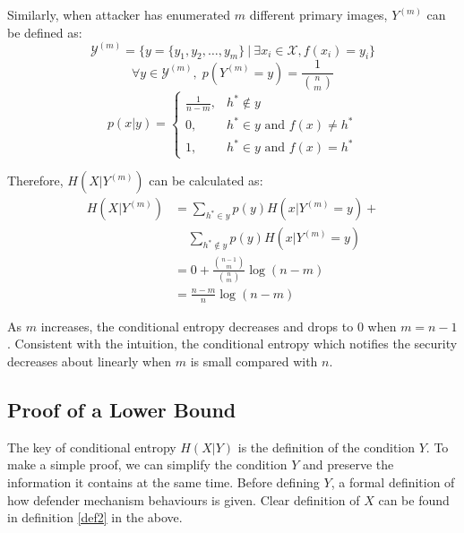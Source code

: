 \documentclass[10pt, conference, compsocconf]{IEEEtran}
\begin{document}
		Similarly, when attacker has enumerated $m$ different primary images, $Y^{(m)}$ can be defined
		as:
		\begin{equation*}
			\mathcal Y^{(m)} = \{ y = \{y_1, y_2, \ldots, y_m\} \: | \: \exists x_i \in \mathcal X, f(x_i) = y_i\}
		\end{equation*}
		\begin{equation*}
			\forall y \in \mathcal Y^{(m)}, \; p(Y^{(m)} = y) = \frac{1}{\binom{n}{m}}
		\end{equation*}
		\begin{equation*}
			p(x|y) = \begin{cases}
				\frac{1}{n-m}, &h^* \notin y\\
				0, &h^* \in y \text{ and } f(x) \neq h^*\\
				1, &h^* \in y \text{ and } f(x) = h^*
			\end{cases}
		\end{equation*}
		
		Therefore, $H(X | Y^{(m)})$ can be calculated as:
		\begin{align*}
			H(X | Y^{(m)}) %
				&= \sum_{h^* \in y} p(y) H(x | Y^{(m)} = y) + \\
					& \;\;\;\; \sum_{h^* \notin y} p(y) H(x | Y^{(m)} = y)\\
				&= 0+\frac{\binom{n-1}{m}}{\binom{n}{m}} \log(n-m)\\
				&= \frac{n-m}{n} \log(n-m)
		\end{align*}
		
		As $m$ increases, 
		the conditional entropy decreases and drops to $0$ when $m = n-1$. 
		Consistent with the intuition, the conditional
		entropy which notifies the security decreases about linearly when $m$ is small 
		compared with $n$.
		
	\subsection{Proof of a Lower Bound}
		The key
		of conditional entropy $H(X|Y)$ is the definition of the condition $Y$.
		To make a simple proof, we can simplify the
		condition $Y$ and preserve the information it contains
		at the same time. Before defining $Y$, a
		formal definition of how defender mechanism behaviours is given. Clear
		definition of $X$ can be found in definition \ref{def2} in the above.
		
\end{document}
